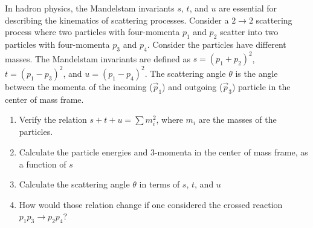 
\newcommand{\ma}{\ensuremath{M}\xspace}
\newcommand{\mb}{\ensuremath{m_1}\xspace}
\newcommand{\mc}{\ensuremath{m_2}\xspace}
\newcommand{\eb}{\ensuremath{E_1}\xspace}
\newcommand{\ec}{\ensuremath{E_2}\xspace}

\newcommand{\pb}{\ensuremath{p_1}\xspace}
\newcommand{\pc}{\ensuremath{p_2}\xspace}
\newcommand{\pvecb}{\ensuremath{\textbf{p}_1}\xspace}
\newcommand{\pvecc}{\ensuremath{\textbf{p}_2}\xspace}
\newcommand{\pvecstar}{\ensuremath{\textbf{p}^{*}}\xspace}
\newcommand{\pmodvecb}{\ensuremath{\text{p}_1}\xspace}
\newcommand{\pmodvecc}{\ensuremath{\text{p}_2}\xspace}
\newcommand{\pmodvecstar}{\ensuremath{\text{p}^{*}}\xspace}


In hadron physics, the Mandelstam invariants $s$, $t$, and $u$ are essential for describing the kinematics of scattering processes.
Consider a $2 \rightarrow 2$ scattering process where two particles with four-momenta $p_1$ and $p_2$ scatter into two particles with four-momenta $p_3$ and $p_4$.
Consider the particles have different masses. The Mandelstam invariants are defined as $s = (p_1 + p_2)^2$, $t = (p_1 - p_3)^2$, and $u = (p_1 - p_4)^2$.
The scattering angle $\theta$ is the angle between the momenta of the incoming ($\vec{p}_1$) and outgoing ($\vec{p}_3$) particle in the center of mass frame.

\begin{enumerate}
    \item Verify the relation $s + t + u = \sum m_i^2$, where $m_i$ are the masses of the particles.
    \item Calculate the particle energies and 3-momenta in the center of mass frame, as a function of $s$
    \item Calculate the scattering angle  $\theta$ in terms of $s$, $t$, and $u$
    \item How would those relation change if one considered the crossed reaction $p_1 p_{\bar 3} \to p_{\bar 2} p_4$?
\end{enumerate}
